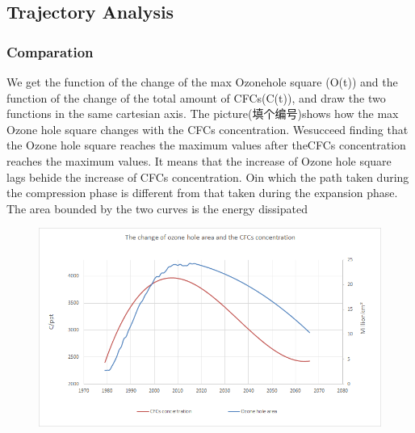 \documentclass[12pt]{article}
\begin{document}
\subsection{Trajectory Analysis}
\subsubsection{Comparation}
We get the function of the change of the max Ozonehole square (O(t)) and the function of the change of the total amount of CFCs(C(t)), and draw the two functions in the same cartesian axis. The picture(填个编号)shows how the max Ozone hole square changes with the CFCs concentration. Wesucceed finding that the Ozone hole square reaches the maximum values after theCFCs concentration reaches the maximum values. It means that the increase of Ozone hole square lags behide the increase of CFCs concentration.
Oin which the path taken during the compression phase
is different from that taken during the expansion phase. The area bounded by the two curves is the energy dissipated
\begin{center}
\begin{figure}[htpb]
\centering
\includegraphics[scale=0.4]{ha}
\caption{}\label{fig:twoline}
\end{figure}
\end{center}
\end{document}
